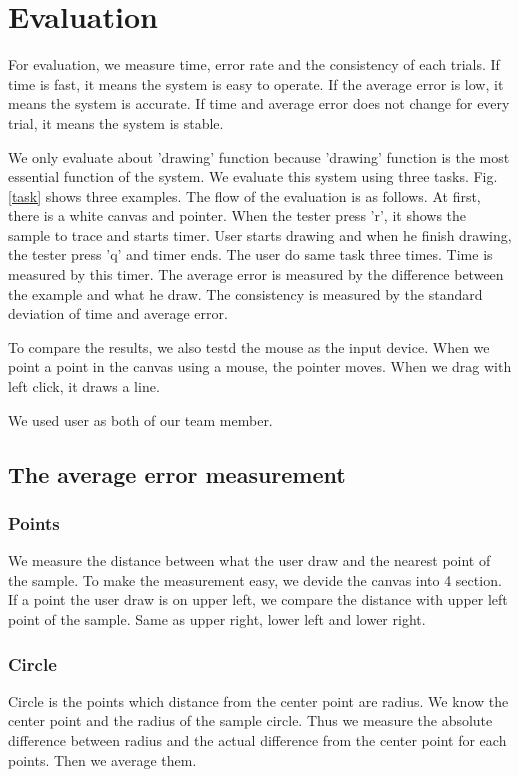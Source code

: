 \clearpage
\section{Evaluation}
For evaluation, we measure time, error rate and the consistency of each trials.
If time is fast, it means the system is easy to operate.
If the average error is low, it means the system is accurate.
If time and average error does not change for every trial, it means the system is stable.
\par
We only evaluate about 'drawing' function because 'drawing' function is the most essential function of the system.
We evaluate this system using three tasks. Fig. \ref{task} shows three examples.
The flow of the evaluation is as follows. At first, there is a white canvas and pointer.
When the tester press 'r', it shows the sample to trace and starts timer.
User starts drawing and when he finish drawing, the tester press 'q' and timer ends.
The user do same task three times.
Time is measured by this timer. The average error is measured by the difference between the example and what he draw. The consistency is measured by the standard deviation of time and average error.
\par
To compare the results, we also testd the mouse as the input device. When we point a point in the canvas using a mouse, the pointer moves. When we drag with left click, it draws a line.\par
We used user as both of our team member.
\subsection{The average error measurement}
\subsubsection{Points}
We measure the distance between what the user draw and the nearest point of the sample.
To make the measurement easy, we devide the canvas into 4 section.
If a point the user draw is on upper left, we compare the distance with upper left point of the sample. Same as upper right, lower left and lower right.
\subsubsection{Circle}
Circle is the points which distance from the center point are radius.
We know the center point and the radius of the sample circle.
Thus we measure the absolute difference between radius and the actual difference from the center point for each points. Then we average them.
